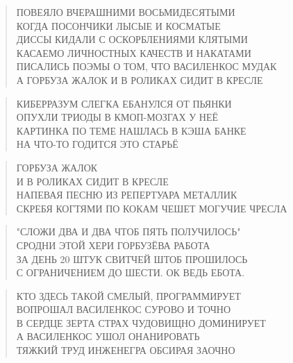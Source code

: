 \poemtitle{***}
\begin{verse}
ПОВЕЯЛО ВЧЕРАШНИМИ ВОСЬМИДЕСЯТЫМИ\\
КОГДА ПОСОНЧИКИ ЛЫСЫЕ И КОСМАТЫЕ\\
ДИССЫ КИДАЛИ С ОСКОРБЛЕНИЯМИ КЛЯТЫМИ\\
КАСАЕМО ЛИЧНОСТНЫХ КАЧЕСТВ И НАКАТАМИ\\
ПИСАЛИСЬ ПОЭМЫ О ТОМ, ЧТО ВАСИЛЕНКОС МУДАК\\
А ГОРБУЗА ЖАЛОК И В РОЛИКАХ СИДИТ В КРЕСЛЕ
\end{verse}

\poemtitle{***}
\begin{verse}
КИБЕРРАЗУМ СЛЕГКА ЕБАНУЛСЯ ОТ ПЬЯНКИ\\
ОПУХЛИ ТРИОДЫ В КМОП-МОЗГАХ У НЕЁ\\
КАРТИНКА ПО ТЕМЕ НАШЛАСЬ В КЭША БАНКЕ\\
НА ЧТО-ТО ГОДИТСЯ ЭТО СТАРЬЁ
\end{verse}

\poemtitle{***}
\begin{verse}
ГОРБУЗА ЖАЛОК \\
И В РОЛИКАХ СИДИТ В КРЕСЛЕ\\
НАПЕВАЯ ПЕСНЮ ИЗ РЕПЕРТУАРА МЕТАЛЛИК\\
СКРЕБЯ КОГТЯМИ ПО КОКАМ ЧЕШЕТ МОГУЧИЕ ЧРЕСЛА
\end{verse}

\poemtitle{***}
\begin{verse}
"СЛОЖИ ДВА И ДВА ЧТОБ ПЯТЬ ПОЛУЧИЛОСЬ"\\
СРОДНИ ЭТОЙ ХЕРИ ГОРБУЗЁВА РАБОТА\\
ЗА ДЕНЬ 20 ШТУК СВИТЧЕЙ ШТОБ ПРОШИЛОСЬ\\
С ОГРАНИЧЕНИЕМ ДО ШЕСТИ. ОК ВЕДЬ ЕБОТА.
\end{verse}

\poemtitle{***}
\begin{verse}
КТО ЗДЕСЬ ТАКОЙ СМЕЛЫЙ, ПРОГРАММИРУЕТ\\
ВОПРОШАЛ ВАСИЛЕНКОС СУРОВО И ТОЧНО\\
В СЕРДЦЕ ЗЕРТА СТРАХ ЧУДОВИЩНО ДОМИНИРУЕТ\\
А ВАСИЛЕНКОС УШОЛ ОНАНИРОВАТЬ\\
ТЯЖКИЙ ТРУД ИНЖЕНЕГРА ОБСИРАЯ ЗАОЧНО
\end{verse}

